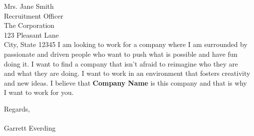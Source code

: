 \documentclass[11pt]{letter} %
\begin{document}
\begin{letter}{Mrs. Jane Smith \\
Recruitment Officer \\
The Corporation \\
123 Pleasant Lane \\
City, State 12345}
I am looking to work for a company where I am surrounded by passionate and driven people who want to push what is possible and have fun doing it. I want to find a company that isn’t afraid to reimagine who they are and what they are doing. I want to work in an environment that fosters creativity and new ideas. I believe that \textbf{Company Name} is this company and that is why I want to work for you.

Regards, \\ \\

Garrett Everding




\end{letter}
\end{document}
